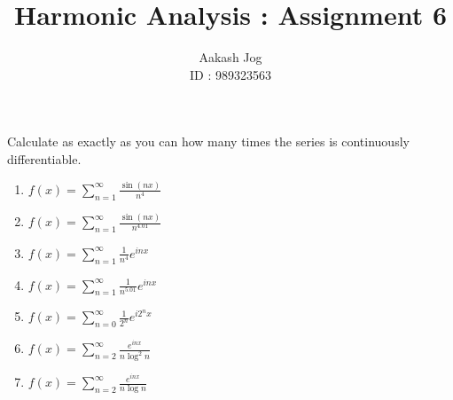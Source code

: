 \documentclass[fleqn, a4paper, 11pt, oneside]{amsart}
\title{Harmonic Analysis : Assignment 6}
\author
{
	Aakash Jog\\
	ID : 989323563
}
\date{\formatdate{15}{12}{2015}}
\theoremstyle{definition}
\theoremstyle{theorem}
\begin{document}

\maketitle

\begin{question}
	Calculate as exactly as you can how many times the series is continuously differentiable.
	\begin{enumerate}
		\item $f(x) = \sum\limits_{n = 1}^{\infty} \frac{\sin(n x)}{n^4}$
		\item $f(x) = \sum\limits_{n = 1}^{\infty} \frac{\sin(n x)}{n^{4.01}}$
		\item $f(x) = \sum\limits_{n = 1}^{\infty} \frac{1}{n^4} e^{i n x}$
		\item $f(x) = \sum\limits_{n = 1}^{\infty} \frac{1}{n^{5.01}} e^{i n x}$
		\item $f(x) = \sum\limits_{n = 0}^{\infty} \frac{1}{2^n} e^{i 2^n x}$
		\item $f(x) = \sum\limits_{n = 2}^{\infty} \frac{e^{i n x}}{n \log^2 n}$
		\item $f(x) = \sum\limits_{n = 2}^{\infty} \frac{e^{i n x}}{n \log n}$
	\end{enumerate}
\end{question}
\end{document}
